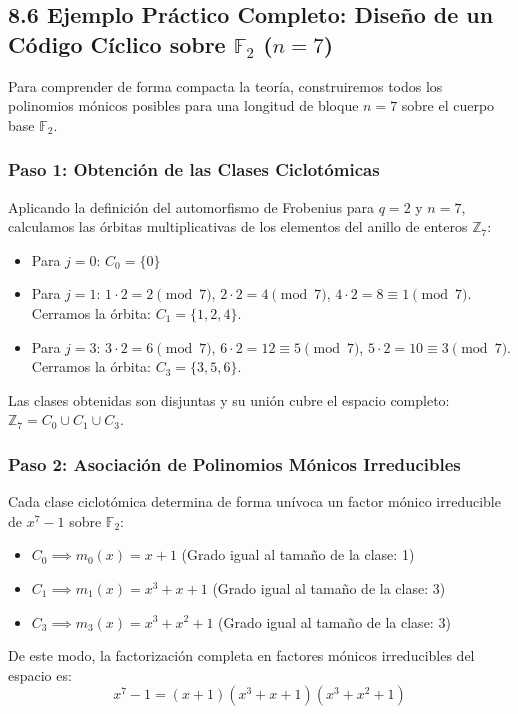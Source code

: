 \documentclass{article}
\begin{document}
\subsection{8.6 Ejemplo Práctico Completo: Diseño de un Código Cíclico sobre $\mathbb{F}_2$ ($n=7$)}

Para comprender de forma compacta la teoría, construiremos todos los polinomios mónicos posibles para una longitud de bloque $n = 7$ sobre el cuerpo base $\mathbb{F}_2$.

\subsubsection{Paso 1: Obtención de las Clases Ciclotómicas}
Aplicando la definición del automorfismo de Frobenius para $q=2$ y $n=7$, calculamos las órbitas multiplicativas de los elementos del anillo de enteros $\mathbb{Z}_7$:
\begin{itemize}
    \item Para $j=0$: $C_0 = \{0\}$
    \item Para $j=1$: $1 \cdot 2 = 2 \pmod 7$, $2 \cdot 2 = 4 \pmod 7$, $4 \cdot 2 = 8 \equiv 1 \pmod 7$. Cerramos la órbita: $C_1 = \{1, 2, 4\}$.
    \item Para $j=3$: $3 \cdot 2 = 6 \pmod 7$, $6 \cdot 2 = 12 \equiv 5 \pmod 7$, $5 \cdot 2 = 10 \equiv 3 \pmod 7$. Cerramos la órbita: $C_3 = \{3, 5, 6\}$.
\end{itemize}
Las clases obtenidas son disjuntas y su unión cubre el espacio completo: $\mathbb{Z}_7 = C_0 \cup C_1 \cup C_3$.

\subsubsection{Paso 2: Asociación de Polinomios Mónicos Irreducibles}
Cada clase ciclotómica determina de forma unívoca un factor mónico irreducible de $x^7 - 1$ sobre $\mathbb{F}_2$:
\begin{itemize}
    \item $C_0 \implies m_0(x) = x + 1$ (Grado igual al tamaño de la clase: 1)
    \item $C_1 \implies m_1(x) = x^3 + x + 1$ (Grado igual al tamaño de la clase: 3)
    \item $C_3 \implies m_3(x) = x^3 + x^2 + 1$ (Grado igual al tamaño de la clase: 3)
\end{itemize}
De este modo, la factorización completa en factores mónicos irreducibles del espacio es:
\[
x^7 - 1 = (x + 1)(x^3 + x + 1)(x^3 + x^2 + 1)
\]
\end{document}
